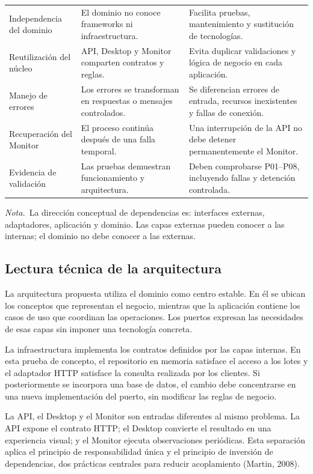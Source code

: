 \documentclass[12pt,letterpaper]{article}
\newcommand{\tablaNota}[1]{\par\smallskip\noindent\textit{Nota.}~#1}
\begin{document}
\begin{table}[!ht]
\begin{tabularx}{\textwidth}{@{}P{3.05cm}P{4.0cm}Y@{}}
Independencia del dominio & El dominio no conoce frameworks ni infraestructura. & Facilita pruebas, mantenimiento y sustitución de tecnologías.\\
Reutilización del núcleo & API, Desktop y Monitor comparten contratos y reglas. & Evita duplicar validaciones y lógica de negocio en cada aplicación.\\
Manejo de errores & Los errores se transforman en respuestas o mensajes controlados. & Se diferencian errores de entrada, recursos inexistentes y fallas de conexión.\\
Recuperación del Monitor & El proceso continúa después de una falla temporal. & Una interrupción de la API no debe detener permanentemente el Monitor.\\
Evidencia de validación & Las pruebas demuestran funcionamiento y arquitectura. & Deben comprobarse P01–P08, incluyendo fallas y detención controlada.\\
\bottomrule
\end{tabularx}
\tablaNota{La dirección conceptual de dependencias es: interfaces externas, adaptadores, aplicación y dominio. Las capas externas pueden conocer a las internas; el dominio no debe conocer a las externas.}
\end{table}

\subsection{Lectura técnica de la arquitectura}
La arquitectura propuesta utiliza el dominio como centro estable. En él se ubican los conceptos que representan el negocio, mientras que la aplicación contiene los casos de uso que coordinan las operaciones. Los puertos expresan las necesidades de esas capas sin imponer una tecnología concreta.

La infraestructura implementa los contratos definidos por las capas internas. En esta prueba de concepto, el repositorio en memoria satisface el acceso a los lotes y el adaptador HTTP satisface la consulta realizada por los clientes. Si posteriormente se incorpora una base de datos, el cambio debe concentrarse en una nueva implementación del puerto, sin modificar las reglas de negocio.

La API, el Desktop y el Monitor son entradas diferentes al mismo problema. La API expone el contrato HTTP; el Desktop convierte el resultado en una experiencia visual; y el Monitor ejecuta observaciones periódicas. Esta separación aplica el principio de responsabilidad única y el principio de inversión de dependencias, dos prácticas centrales para reducir acoplamiento (Martin, 2008).
\end{document}
